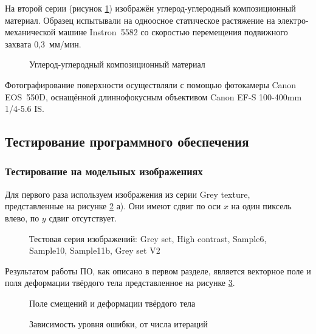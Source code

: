 На второй серии (рисунок \ref{pic:carbon_deform}) изображён углерод-углеродный композиционный материал. Образец испытывали на одноосное статическое растяжение на электро-механической машине Instron 5582 со скоростью перемещения подвижного захвата 0,3 мм/мин.
\begin{figure}[ht]
\caption{Углерод-углеродный композиционный материал}
\label{pic:carbon_deform}
\end{figure}

Фотографирование поверхности осуществляли с помощью фотокамеры Canon EOS 550D, оснащённой длиннофокусным объективом Canon EF-S 100-400mm 1/4-5.6 IS.



\subsection{Тестирование программного обеспечения}
\subsubsection{Тестирование на модельных изображениях}

Для первого раза используем изображения из серии Grey texture, представленные на рисунке \ref{pic:gray_mix} а). Они имеют сдвиг по оси $x$ на один пиксель влево, по $y$ сдвиг отсутствует.

\begin{figure}[ht]
\caption{Тестовая серия изображений: Grey set, High contrast, Sample6, Sample10, Sample11b, Grey set V2 }
\label{pic:gray_mix}
\end{figure}

Результатом работы ПО, как описано в первом разделе, является векторное поле и поля деформации твёрдого тела представленное на рисунке \ref{pic:gray_set_out}.

\begin{figure}[ht]
\caption{Поле смещений и деформации твёрдого тела}
\label{pic:gray_set_out}
\end{figure}

\begin{figure}[ht]
\caption{Зависимость уровня ошибки, от числа итераций}
\label{pic:gray_set_func_iteration}
\end{figure}


